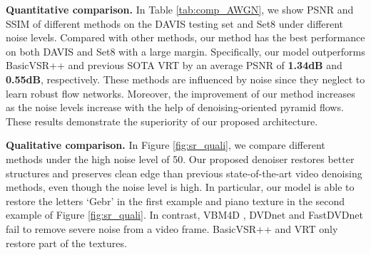 \documentclass[10pt,twocolumn,letterpaper]{article}
\newlength \g
\begin{document}
\vspace{1mm}
\noindent\textbf{Quantitative comparison.}
In Table \ref{tab:comp_AWGN}, we show PSNR and SSIM of different methods on the DAVIS testing set \cite{khoreva2018davis} and Set8 \cite{tassano2019dvdnet} under different noise levels.
Compared with other methods, our method has the best performance on both DAVIS and Set8 with a large margin.
Specifically, our model outperforms BasicVSR++ \cite{chan2022basicvsrpp2} and previous SOTA VRT \cite{liang2022vrt} by an average PSNR of \textbf{1.34dB} and \textbf{0.55dB}, respectively.
These methods are influenced by noise since they neglect to learn robust flow networks.
Moreover, the improvement of our method increases as the noise levels increase with the help of denoising-oriented pyramid flows.
These results demonstrate the superiority of our proposed architecture.

\vspace{1mm}
\noindent\textbf{Qualitative comparison.}
In Figure \ref{fig:sr_quali}, we compare different methods under the high noise level of 50.
Our proposed denoiser restores better structures and preserves clean edge than previous state-of-the-art video denoising methods, even though the noise level is high. 
In particular, our model is able to restore the letters `Gebr' in the first example and piano texture in the second example of Figure \ref{fig:sr_quali}. In contrast, VBM4D \cite{maggioni2012bm4d}, DVDnet \cite{tassano2019dvdnet} and FastDVDnet \cite{tassano2020fastdvdnet} fail to remove severe noise from a video frame.
BasicVSR++ \cite{chan2021basicvsrpp} and VRT \cite{liang2022vrt} only restore part of the textures.
\end{document}
